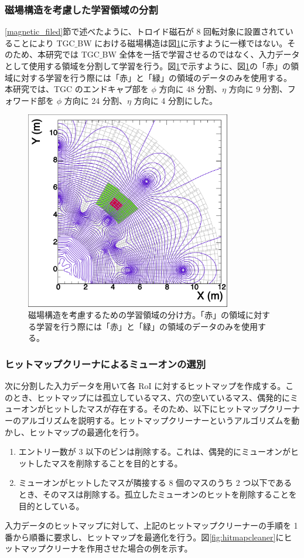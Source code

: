 \subsubsection{磁場構造を考慮した学習領域の分割}
\ref{magnetic_filed}節で述べたように、トロイド磁石が 8 回転対象に設置されていることにより TGC$\_$BW における磁場構造は図\ref{fig:Mag}に示すように一様ではない。そのため、本研究では TGC$\_$BW 全体を一括で学習させるのではなく、入力データとして使用する領域を分割して学習を行う。図\ref{fig:Mag}で示すように、図\ref{fig:Mag}の「赤」の領域に対する学習を行う際には「赤」と「緑」の領域のデータのみを使用する。
本研究では、TGC のエンドキャプ部を $\phi$ 方向に 48 分割、$\eta$ 方向に 9 分割、フォワード部を $\phi$ 方向に 24 分割、$\eta$ 方向に 4 分割にした。
\begin{figure}[tb]
  \centering
  \includegraphics[clip, width=9cm]{fig/4/c1_withMag.pdf}
  \caption{磁場構造を考慮するための学習領域の分け方。「赤」の領域に対する学習を行う際には「赤」と「緑」の領域のデータのみを使用する。}
  \label{fig:Mag}
\end{figure}

\subsubsection{ヒットマップクリーナによるミューオンの選別}
次に分割した入力データを用いて各 RoI に対するヒットマップを作成する。このとき、ヒットマップには孤立しているマス、穴の空いているマス、偶発的にミューオンがヒットしたマスが存在する。そのため、以下にヒットマップクリーナーのアルゴリズムを説明する。ヒットマップクリーナーというアルゴリズムを動かし、ヒットマップの最適化を行う。
\begin{enumerate}
   \item エントリー数が 3 以下のビンは削除する。これは、偶発的にミューオンがヒットしたマスを削除することを目的とする。
   \item ミューオンがヒットしたマスが隣接する 8 個のマスのうち 2 つ以下であるとき、そのマスは削除する。孤立したミューオンのヒットを削除することを目的としている。
\end{enumerate}
入力データのヒットマップに対して、上記のヒットマップクリーナーの手順を 1 番から順番に要求し、ヒットマップを最適化を行う。図\ref{fig:hitmapcleaner}にヒットマップクリーナを作用させた場合の例を示す。

